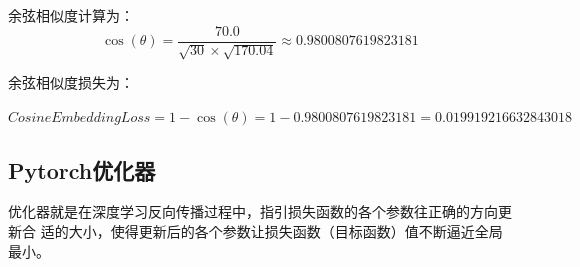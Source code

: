 \begin{enumerate}[label=\arabic*)]
\begin{example}
    余弦相似度计算为：
    $$\cos(\theta)=\frac{70.0}{\sqrt{30}\times\sqrt{170.04}}\approx0.9800807619823181$$
    
    余弦相似度损失为：
    
    $CosineEmbeddingLoss=1-\cos(\theta)=1-0.9800807619823181=0.019919216632843018$
\end{example}
\end{enumerate}

\subsection{Pytorch优化器}
\label{subsubsec:Pytorch_nn_functional_optimizer}
优化器就是在深度学习反向传播过程中，指引损失函数的各个参数往正确的方向更新合
适的大小，使得更新后的各个参数让损失函数（目标函数）值不断逼近全局最小。

